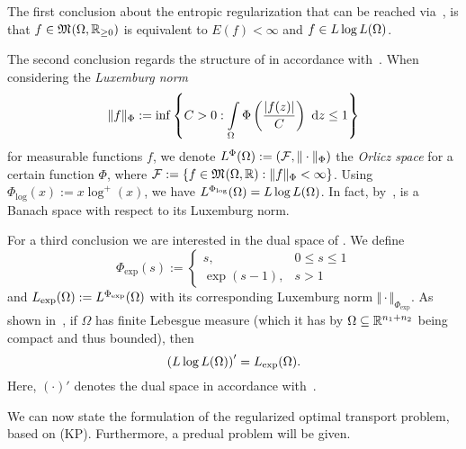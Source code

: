 The first conclusion about the entropic regularization that can be reached via\ \cite[Proposition~2.1]{Cla2021}, is that $f \in \MF{\Omega}{\RZero}$ is equivalent to $E(f) < \infty$ and $f \in \LLL$.

The second conclusion regards the structure of \LLL{} in accordance with\ \cite[Definition~2.3]{Cla2021}. When considering the \textit{Luxemburg norm}
\[ \Vert f \Vert_\Phi := \inf \left\{ C > 0 : \int\limits_\Omega \Phi\left( \frac{\vert f(z) \vert}{C} \right)~\D[z] \le 1 \right\} \]
for measurable functions $f$, we denote $\Orlicz{\Phi} := (\mathcal{F}, \Vert \cdot \Vert_\Phi)$ the \textit{Orlicz space} for a certain function $\Phi$, where $\mathcal{F} := \{ f \in \MF{\Omega}{\R} : \Vert f \Vert_\Phi < \infty \}$. Using $\Phi_{\log}(x) := x \log^+ (x)$, we have $\Orlicz{\Phi_{\log}} = \LLL$. In fact, by\ \cite[Theorem~2.5]{Cla2021}, \LLL{} is a Banach space with respect to its Luxemburg norm.

For a third conclusion we are interested in the dual space of \LLL{}. We define
\[ \Phi_{\exp}(s) := \begin{cases}
	s, & 0 \le s \le 1 \\
	\exp(s - 1), & s > 1
\end{cases} \]
and $\Lexp := \Orlicz{\Phi_{\exp}}$ with its corresponding Luxemburg norm $\Vert \cdot \Vert_{\Phi_{\exp}}$. As shown in\ \cite[Proposition~2.7]{Cla2021}, if $\Omega$ has finite Lebesgue measure (which it has by $\Omega \subseteq \R^{n_1 + n_2}$ being compact and thus bounded), then
\[ {(\LLL)}' = \Lexp. \]
Here, ${(\cdot)}'$ denotes the dual space in accordance with\ \cite[Definition~4.28]{Ryn2008}.

We can now state the formulation of the regularized optimal transport problem, based on (KP). Furthermore, a predual problem will be given.

